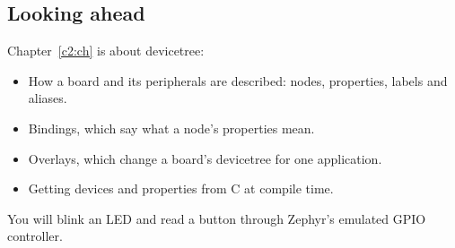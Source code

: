 \subsection*{Looking ahead}
Chapter~\ref{c2:ch} is about devicetree:

\begin{itemize}
  \item How a board and its peripherals are described: nodes, properties, labels and aliases.
  \item Bindings, which say what a node’s properties mean.
  \item Overlays, which change a board’s devicetree for one application.
  \item Getting devices and properties from C at compile time.
\end{itemize}

You will blink an LED and read a button through Zephyr’s emulated GPIO controller.

